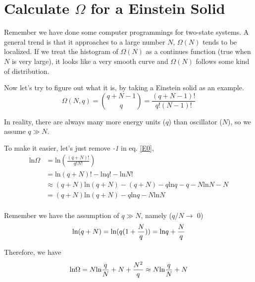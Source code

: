 

\section{Calculate $\Omega$ for a Einstein Solid}
Remember we have done some computer programmings for two-state systems.
A general trend is that it approaches to a large number $N$, $\Omega(N)$ tends to be localized.
If we treat the histogram of $\Omega(N)$ as a continues function (true when $N$ is very large),
it looks like a very smooth curve and $\Omega(N)$ follows some kind of distribution. 

Now let's try to figure out what it is, by taking a Einstein solid as an example. 
\begin{equation} \label{E0}
 \Omega(N, q) = \binom{q+N-1}{q} = \frac{(q+N-1)!}{q!(N-1)!}
\end{equation}

In reality, there are always many more energy units ($q$) than oscillator ($N$), so we assume $q\gg N$.

To make it easier, let's just remove \textit{-1} in eq. \ref{E0},
\begin{equation} \label{E1}
\begin{split}
 \text{ln}\Omega &= \text{ln}(\frac{(q+N)!}{q!N!})\\
         &= \text{ln}(q+N)! - \text{ln}q! - \text{ln}N!\\
   &\approx (q+N)\text{ln}(q+N) - (q+N) - q\text{ln}q - q - N\text{ln}N - N\\
        & = (q+N)\text{ln}(q+N) - q\text{ln}q - N\text{ln}N \\
\end{split}
\end{equation}

Remember we have the assumption of $q\gg N$, namely ($q/N \rightarrow$ 0)
\begin{equation} \label{E2}
       \text{ln}(q+N) = \text{ln}(q(1+\frac{N}{q}))\\
                      = \text{ln}q + \frac{N}{q} 
\end{equation}

Therefore, we have 
\begin{equation} \label{E3}
       \text{ln}\Omega = N\text{ln}\frac{q}{N} + N + \frac{N^2}{q}\\
                 \approx N\text{ln}\frac{q}{N} + N 
\end{equation}


